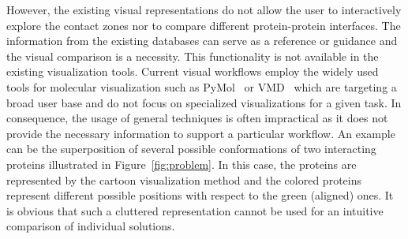 \documentclass[11pt,a4paper,titlepage,oneside,onecolumn]{article}
\begin{document}
However, the existing visual representations do not allow the user to interactively explore the contact zones nor to compare different protein-protein interfaces.
The information from the existing databases can serve as a reference or guidance and the visual comparison is a necessity.
This functionality is not available in the existing visualization tools.
Current visual workflows employ the widely used tools for molecular visualization such as PyMol~\cite{pymol} or VMD~\cite{VMD} which are targeting a broad user base and do not focus on specialized visualizations for a given task.
In consequence, the usage of general techniques is often impractical as it does not  provide the necessary information to support a particular workflow.
An example can be the superposition of several possible conformations of two interacting proteins illustrated in Figure~\ref{fig:problem}.
In this case, the proteins are represented by the cartoon visualization method and the colored proteins represent different possible positions with respect to the green (aligned) ones.
It is obvious that such a cluttered representation cannot be used for an intuitive comparison of individual solutions.
\end{document}
